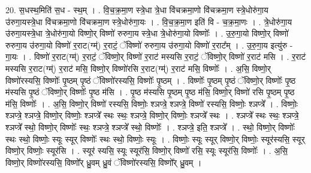\documentclass[17pt]{extarticle}
\begin{document}
20. स॒धस्थ॒मिति॑ स॒ध - स्थ॒म् । . वि॒च॒क्र॒मा॒ण स्त्रे॒धा त्रे॒धा वि॑चक्रमा॒णो वि॑चक्रमा॒ण स्त्रे॒धोरु॑गा॒य उ॑रुगा॒यस्त्रे॒धा वि॑चक्रमा॒णो वि॑चक्रमा॒ण स्त्रे॒धोरु॑गा॒यः । . वि॒च॒क्र॒मा॒ण इति॑ वि - च॒क्र॒मा॒णः । . त्रे॒धोरु॑गा॒य उ॑रुगा॒यस्त्रे॒धा त्रे॒धोरु॑गा॒यो विष्णो॒र् विष्णो॑ रुरुगा॒य स्त्रे॒धा त्रे॒धोरु॑गा॒यो विष्णोः᳚ । . उ॒रु॒गा॒यो विष्णो॒र् विष्णो॑ रुरुगा॒य उ॑रुगा॒यो विष्णो॑ र॒राट(ग्म्॑) र॒राटं॒ ॅविष्णो॑ रुरुगा॒य उ॑रुगा॒यो विष्णो॑ र॒राट᳚म् । . उ॒रु॒गा॒य इत्यु॑रु - गा॒यः । . विष्णो॑ र॒राट(ग्म्॑) र॒राटं॒ ॅविष्णो॒र् विष्णो॑ र॒राट॑ मस्यसि र॒राटं॒ ॅविष्णो॒र् विष्णो॑ र॒राट॑ मसि । . र॒राट॑ मस्यसि र॒राट(ग्म्॑) र॒राट॑ मसि॒ विष्णो॒र् विष्णो॑रसि र॒राट(ग्म्॑) र॒राट॑ मसि॒ विष्णोः᳚ । . अ॒सि॒ विष्णो॒र् विष्णो॑रस्यसि॒ विष्णोः᳚ पृ॒ष्ठम् पृ॒ष्ठं ॅविष्णो॑रस्यसि॒ विष्णोः᳚ पृ॒ष्ठम् । . विष्णोः᳚ पृ॒ष्ठम् पृ॒ष्ठं ॅविष्णो॒र् विष्णोः᳚ पृ॒ष्ठ म॑स्यसि पृ॒ष्ठं ॅविष्णो॒र् विष्णोः᳚ पृ॒ष्ठ म॑सि । . पृ॒ष्ठ म॑स्यसि पृ॒ष्ठम् पृ॒ष्ठ म॑सि॒ विष्णो॒र् विष्णो॑ रसि पृ॒ष्ठम् पृ॒ष्ठ म॑सि॒ विष्णोः᳚ । . अ॒सि॒ विष्णो॒र् विष्णो॑ रस्यसि॒ विष्णोः॒ श्ञप्त्रे॒ श्ञप्त्रे॒ विष्णो॑ रस्यसि॒ विष्णोः॒ श्ञप्त्रे᳚ । . विष्णोः॒ श्ञप्त्रे॒ श्ञप्त्रे॒ विष्णो॒र् विष्णोः॒ श्ञप्त्रे᳚ स्थः स्थः॒ श्ञप्त्रे॒ विष्णो॒र् विष्णोः॒ श्ञप्त्रे᳚ स्थः । . श्ञप्त्रे᳚ स्थः स्थः॒ श्ञप्त्रे॒ श्ञप्त्रे᳚ स्थो॒ विष्णो॒र् विष्णोः᳚ स्थः॒ श्ञप्त्रे॒ श्ञप्त्रे᳚ स्थो॒ विष्णोः᳚ । . श्ञप्त्रे॒ इति॒ श्ञप्त्रे᳚ । . स्थो॒ विष्णो॒र् विष्णोः᳚ स्थः स्थो॒ विष्णोः॒ स्यूः स्यूर् विष्णोः᳚ स्थः स्थो॒ विष्णोः॒ स्यूः । . विष्णोः॒ स्यूः स्यूर् विष्णो॒र् विष्णोः॒ स्यूर॑स्यसि॒ स्यूर् विष्णो॒र् विष्णोः॒ स्यूर॑सि । . स्यूर॑ स्यसि॒ स्यूः स्यूर॑सि॒ विष्णो॒र् विष्णो॑ रसि॒ स्यूः स्यूर॑सि॒ विष्णोः᳚ । . अ॒सि॒ विष्णो॒र् विष्णो॑रस्यसि॒ विष्णो᳚र् ध्रु॒वम् ध्रु॒वं ॅविष्णो॑रस्यसि॒ विष्णो᳚र् ध्रु॒वम् । \newline
\end{document}
